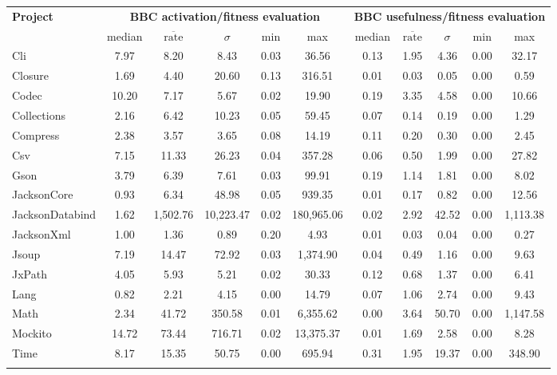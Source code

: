 \begin{tabular}{ l | ccccc | ccccc }
\hline 
\textbf{Project} & \multicolumn{5}{c|}{\textbf{BBC activation/fitness evaluation}} & \multicolumn{5}{c}{\textbf{BBC usefulness/fitness evaluation }} \\ 
  & median & $\overline{\text{rate}}$ & $\sigma$ & min & max & median & $\overline{\text{rate}}$ & $\sigma$ & min & max \\ 
\hline 
Cli & 7.97 & 8.20 & 8.43 & 0.03 & 36.56 & 0.13 & 1.95 & 4.36 & 0.00 & 32.17 \\ 
Closure & 1.69 & 4.40 & 20.60 & 0.13 & 316.51 & 0.01 & 0.03 & 0.05 & 0.00 & 0.59 \\ 
Codec & 10.20 & 7.17 & 5.67 & 0.02 & 19.90 & 0.19 & 3.35 & 4.58 & 0.00 & 10.66 \\ 
Collections & 2.16 & 6.42 & 10.23 & 0.05 & 59.45 & 0.07 & 0.14 & 0.19 & 0.00 & 1.29 \\ 
Compress & 2.38 & 3.57 & 3.65 & 0.08 & 14.19 & 0.11 & 0.20 & 0.30 & 0.00 & 2.45 \\ 
Csv & 7.15 & 11.33 & 26.23 & 0.04 & 357.28 & 0.06 & 0.50 & 1.99 & 0.00 & 27.82 \\ 
Gson & 3.79 & 6.39 & 7.61 & 0.03 & 99.91 & 0.19 & 1.14 & 1.81 & 0.00 & 8.02 \\ 
JacksonCore & 0.93 & 6.34 & 48.98 & 0.05 & 939.35 & 0.01 & 0.17 & 0.82 & 0.00 & 12.56 \\ 
JacksonDatabind & 1.62 & 1,502.76 & 10,223.47 & 0.02 & 180,965.06 & 0.02 & 2.92 & 42.52 & 0.00 & 1,113.38 \\ 
JacksonXml & 1.00 & 1.36 & 0.89 & 0.20 & 4.93 & 0.01 & 0.03 & 0.04 & 0.00 & 0.27 \\ 
Jsoup & 7.19 & 14.47 & 72.92 & 0.03 & 1,374.90 & 0.04 & 0.49 & 1.16 & 0.00 & 9.63 \\ 
JxPath & 4.05 & 5.93 & 5.21 & 0.02 & 30.33 & 0.12 & 0.68 & 1.37 & 0.00 & 6.41 \\ 
Lang & 0.82 & 2.21 & 4.15 & 0.00 & 14.79 & 0.07 & 1.06 & 2.74 & 0.00 & 9.43 \\ 
Math & 2.34 & 41.72 & 350.58 & 0.01 & 6,355.62 & 0.00 & 3.64 & 50.70 & 0.00 & 1,147.58 \\ 
Mockito & 14.72 & 73.44 & 716.71 & 0.02 & 13,375.37 & 0.01 & 1.69 & 2.58 & 0.00 & 8.28 \\ 
Time & 8.17 & 15.35 & 50.75 & 0.00 & 695.94 & 0.31 & 1.95 & 19.37 & 0.00 & 348.90 \\ 
 \\ 
\end{tabular}